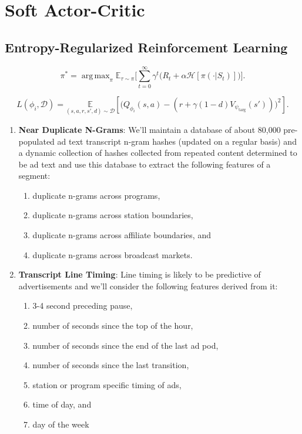 \documentclass[sigchi]{acmart}
\begin{document}
\section{Soft Actor-Critic}

\subsection{Entropy-Regularized Reinforcement Learning}

$$\pi^* =  \operatorname{arg\,max}_{\pi}\mathbb{E}_{\tau\sim\pi}\big[\sum_{t=0}^{\infty}\gamma^t\big(R_t+\alpha \mathcal{H} [\pi(\cdot|S_t)]\big)\big].$$

$$L(\phi_i, {\mathcal D}) = \underset{(s,a,r,s',d) \sim {\mathcal D}}{\mathbb{E}}\left[
\Bigg( Q_{\phi_i}(s,a) - \left(r + \gamma (1 - d) V_{\psi_{\text{targ}}}(s') \right) \Bigg)^2
\right].$$

\begin{enumerate}
	\item\textbf{Near Duplicate N-Grams}: We'll maintain a database of about 80,000 pre-populated ad text transcript n-gram hashes (updated on a regular basis) and a dynamic collection of hashes collected from repeated content determined to be ad text and use this database to extract the following features of a segment:
		\begin{enumerate}
			\item duplicate n-grams across programs,
			\item duplicate n-grams across station boundaries,
			\item duplicate n-grams across affiliate boundaries, and
			\item duplicate n-grams across broadcast markets.
		\end{enumerate}
	\item\textbf{Transcript Line Timing}: Line timing is likely to be predictive of advertisements and we'll consider the following features derived from it:
		\begin{enumerate}
			\item 3-4 second preceding pause,
			\item number of seconds since the top of the hour,
			\item number of seconds since the end of the last ad pod,
			\item number of seconds since the last transition,
			\item station or program specific timing of ads,
			\item time of day, and
			\item day of the week
		\end{enumerate}
\end{enumerate}
\end{document}
